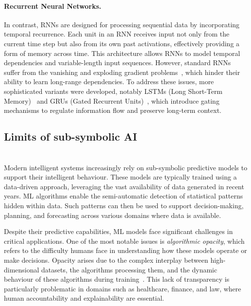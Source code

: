 \paragraph{Recurrent Neural Networks.}
%
In contrast, \glspl{RNN} are designed for processing sequential data by incorporating temporal recurrence.
%
Each unit in an \gls{RNN} receives input not only from the current time step but also from its own past activations, effectively providing a form of memory across time.
%
This architecture allows \glspl{RNN} to model temporal dependencies and variable-length input sequences.
%
However, standard \glspl{RNN} suffer from the vanishing and exploding gradient problems~\cite{bengio1994learning}, which hinder their ability to learn long-range dependencies.
%
To address these issues, more sophisticated variants were developed, notably \glspl{LSTM} (Long Short-Term Memory)~\cite{hochreiter1997long} and \glspl{GRU} (Gated Recurrent Units)~\cite{cho2014learning}, which introduce gating mechanisms to regulate information flow and preserve long-term context.


\subsection{Limits of sub-symbolic \Gls{AI}}\label{subsec:limits-of-sub-symbolic-ai}



\section{}\label{sec:xai}
%
Modern intelligent systems increasingly rely on sub-symbolic predictive models to support their intelligent behaviour.
%
These models are typically trained using a data-driven approach, leveraging the vast availability of data generated in recent years.
%
\Gls{ML} algorithms enable the semi-automatic detection of statistical patterns hidden within data.
%
Such patterns can then be used to support decision-making, planning, and forecasting across various domains where data is available.


Despite their predictive capabilities, \gls{ML} models face significant challenges in critical applications.
%
One of the most notable issues is \emph{algorithmic opacity}, which refers to the difficulty humans face in understanding how these models operate or make decisions.
%
Opacity arises due to the complex interplay between high-dimensional datasets, the algorithms processing them, and the dynamic behaviour of these algorithms during training~\cite{DBLP:journals/bigdatasociety/Burrell16}.
%
This lack of transparency is particularly problematic in domains such as healthcare, finance, and law, where human accountability and explainability are essential.


